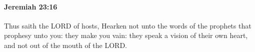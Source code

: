 
		\paragraph{Jeremiah 23:16} %
			\label{JEREMIAH-23-16}

			Thus saith the LORD of hosts, Hearken not unto the words of the prophets that prophesy unto you: they make you vain: they speak a vision of their own heart, and not out of the mouth of the LORD.


